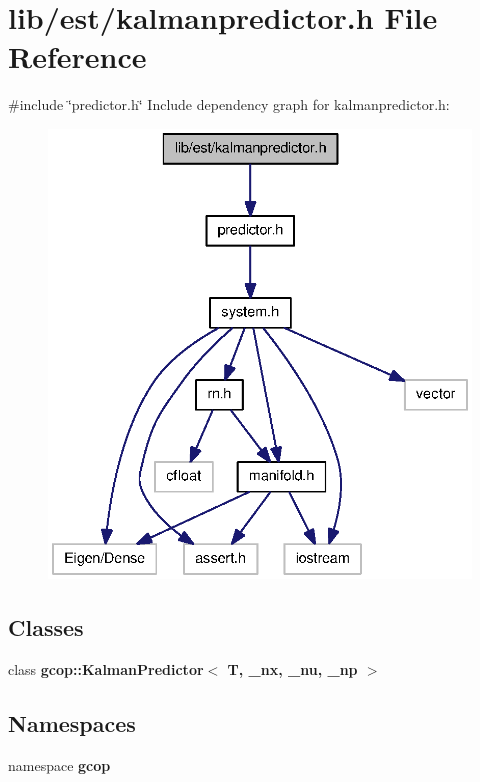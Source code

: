 \section{lib/est/kalmanpredictor.h \-File \-Reference}
\label{kalmanpredictor_8h}
{\ttfamily \#include \char`\"{}predictor.\-h\char`\"{}}\*
\-Include dependency graph for kalmanpredictor.\-h\-:\nopagebreak
\begin{figure}[H]
\begin{center}
\leavevmode
\includegraphics[width=336pt]{kalmanpredictor_8h__incl}
\end{center}
\end{figure}
\subsection*{\-Classes}
\begin{DoxyCompactItemize}
\item 
class {\bf gcop\-::\-Kalman\-Predictor$<$ T, \-\_\-nx, \-\_\-nu, \-\_\-np $>$}
\end{DoxyCompactItemize}
\subsection*{\-Namespaces}
\begin{DoxyCompactItemize}
\item 
namespace {\bf gcop}
\end{DoxyCompactItemize}
